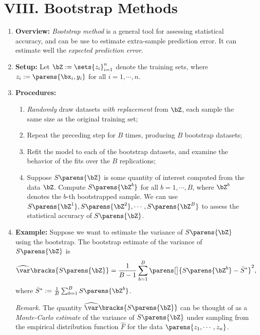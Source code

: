 \documentclass[12pt]{article}
\begin{document}
\section*{VIII. Bootstrap Methods}

\begin{enumerate}[label=\textbf{\arabic*.}]

	\item \textbf{Overview:} \textit{Bootstrap method} is a general tool for assessing statistical accuracy, and can be use to estimate extra-sample prediction error. It can estimate well the \emph{expected prediction error}. 
	
	\item \textbf{Setup:} Let $\bZ := \sets{z_i}_{i=1}^n$ denote the training sets, where $z_i := \parens{\bx_i, y_i}$ for all $i = 1, \cdots, n$. 
	
	\item \textbf{Procedures:} 
	\begin{enumerate}
		\item \emph{Randomly} draw datasets \emph{with replacement} from $\bZ$, each sample the same size as the original training set; 
		\item Repeat the preceding step for $B$ times, producing $B$ bootstrap datasets; 
		\item Refit the model to each of the bootstrap datasets, and examine the behavior of the fits over the $B$ replications; 
		\item Suppose $S \parens{\bZ}$ is some quantity of interest computed from the data $\bZ$. Compute $S \parens{\bZ^b}$ for all $b = 1, \cdots, B$, where $\bZ^b$ denotes the $b$-th bootstrapped sample. We can use $S \parens{\bZ^1}, S \parens{\bZ^2}, \cdots, S \parens{\bZ^B}$ to assess the statistical accuracy of $S \parens{\bZ}$. 
	\end{enumerate}
	
	\item \textbf{Example:} Suppose we want to estimate the variance of $S \parens{\bZ}$ using the bootstrap. The bootstrap estimate of the variance of $S \parens{\bZ}$ is 
	\begin{align*}
		\widehat{\var} \bracks{S \parens{\bZ}} = \frac{1}{B-1} \sum_{b=1}^B \parens[\big]{S \parens{\bZ^b} - \bar{S}^*}^2, 
	\end{align*}
	where $\bar{S}^* := \frac{1}{B} \sum_{b=1}^B S \parens{\bZ^b}$. 
	
	\textit{Remark.} The quantity $\widehat{\var} \bracks{S \parens{\bZ}}$ can be thought of as a \textit{Monte-Carlo estimate} of the variance of $S \parens{\bZ}$ under sampling from the empirical distribution function $\widehat{F}$ for the data $\parens{z_1, \cdots, z_n}$. 
	

\end{enumerate}
\end{document}
